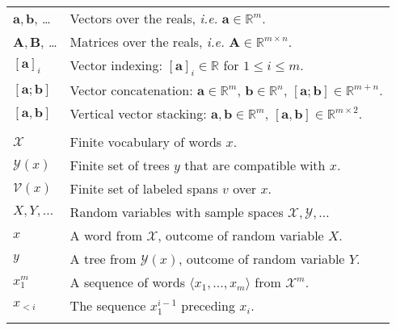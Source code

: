 %
% 

\begin{table}[h]
\center

  \begin{tabular}{l|l}
    \hline\hline
    $\mathbf{a}, \mathbf{b}$, \dots  & Vectors over the reals, \textit{i.e.} $\mathbf{a} \in \mathbb{R}^m$.  \\
    $\mathbf{A}, \mathbf{B}$, \dots & Matrices over the reals, \textit{i.e.} $\mathbf{A} \in \mathbb{R}^{m \times n}$.   \\
    $[\mathbf{a}]_i$ & Vector indexing: $[\mathbf{a}]_i \in \mathbb{R}$ for $1 \leq i \leq m$. \\
    $[\mathbf{a}; \mathbf{b}]$ & Vector concatenation: $\mathbf{a} \in \mathbb{R}^{m}$, $\mathbf{b} \in \mathbb{R}^{n}$, $[\mathbf{a}; \mathbf{b}] \in \mathbb{R}^{m+n}$.  \\
    $[\mathbf{a}, \mathbf{b}]$  & Vertical vector stacking: $\mathbf{a}, \mathbf{b} \in \mathbb{R}^{m}$, $[\mathbf{a}, \mathbf{b}] \in \mathbb{R}^{m \times 2}$.  \\
    & \\

    $\mathcal{X}$ & Finite vocabulary of words $x$. \\
    $\mathcal{Y}(x)$ & Finite set of trees $y$ that are compatible with $x$.  \\
    $\mathcal{V}(x)$ & Finite set of labeled spans $v$ over $x$.  \\
    $X, Y, \dots$ & Random variables with sample spaces $\mathcal{X}, \mathcal{Y}, \dots$  \\
    $x$ & A word from $\mathcal{X}$, outcome of random variable $X$.   \\
    $y$ & A tree from $\mathcal{Y}(x)$, outcome of random variable $Y$.  \\
    $x_1^m$ & A sequence of words $\langle x_1, \dots, x_m \rangle$ from $\mathcal{X}^m$. \\
    $x_{<i}$ & The sequence $x_{1}^{i-1}$ preceding $x_i$.  \\
    & \\


\end{tabular}
\end{table}
